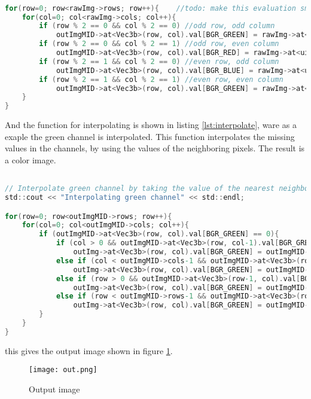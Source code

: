 \begin{lstlisting}[language=C, caption=splitt image, label=lst:splitt]

for(row=0; row<rawImg->rows; row++){	//todo: make this evaluation smaller to increase speed
    for(col=0; col<rawImg->cols; col++){
        if (row % 2 == 0 && col % 2 == 0) //odd row, odd column
            outImgMID->at<Vec3b>(row, col).val[BGR_GREEN] = rawImg->at<uint8_t>(row,col);
        if (row % 2 == 0 && col % 2 == 1) //odd row, even column
            outImgMID->at<Vec3b>(row, col).val[BGR_RED] = rawImg->at<uint8_t>(row,col);
        if (row % 2 == 1 && col % 2 == 0) //even row, odd column
            outImgMID->at<Vec3b>(row, col).val[BGR_BLUE] = rawImg->at<uint8_t>(row,col);
        if (row % 2 == 1 && col % 2 == 1) //even row, even column
            outImgMID->at<Vec3b>(row, col).val[BGR_GREEN] = rawImg->at<uint8_t>(row,col);			
    }
}

\end{lstlisting}

And the function for interpolating is shown in listing \ref{lst:interpolate}, ware as a exaple the green channel is interpolated.
This function interpolates the missing values in the channels, by using the values of the neighboring pixels. The result is a color image.

\begin{lstlisting}[language=C, caption=interpolate missing values, label=lst:interpolate]

// Interpolate green channel by taking the value of the nearest neighbour that is green
std::cout << "Interpolating green channel" << std::endl;

for(row=0; row<outImgMID->rows; row++){
    for(col=0; col<outImgMID->cols; col++){
        if (outImgMID->at<Vec3b>(row, col).val[BGR_GREEN] == 0){
            if (col > 0 && outImgMID->at<Vec3b>(row, col-1).val[BGR_GREEN] != 0)
                outImg->at<Vec3b>(row, col).val[BGR_GREEN] = outImgMID->at<Vec3b>(row, col-1).val[BGR_GREEN];
            else if (col < outImgMID->cols-1 && outImgMID->at<Vec3b>(row, col+1).val[BGR_GREEN] != 0)
                outImg->at<Vec3b>(row, col).val[BGR_GREEN] = outImgMID->at<Vec3b>(row, col+1).val[BGR_GREEN];
            else if (row > 0 && outImgMID->at<Vec3b>(row-1, col).val[BGR_GREEN] != 0)
                outImg->at<Vec3b>(row, col).val[BGR_GREEN] = outImgMID->at<Vec3b>(row-1, col).val[BGR_GREEN];
            else if (row < outImgMID->rows-1 && outImgMID->at<Vec3b>(row+1, col).val[BGR_GREEN] != 0)
                outImg->at<Vec3b>(row, col).val[BGR_GREEN] = outImgMID->at<Vec3b>(row+1, col).val[BGR_GREEN];
        }
    }
}

\end{lstlisting}

this gives the output image shown in figure \ref{fig:output}.

\begin{figure}[ht]
\centering
\texttt{[image: out.png]}
\caption{Output image}
\label{fig:output}
\end{figure}